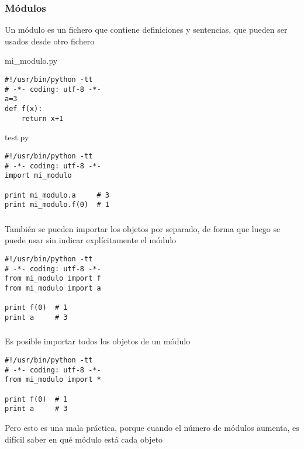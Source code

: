 \documentclass[ucs]{beamer}
\begin{document}
\begin{frame}[fragile]
\frametitle{Módulos}
Un módulo es un fichero que contiene definiciones y sentencias, que pueden ser usados
desde otro fichero

  \begin{footnotesize}
\begin{center}
mi\_modulo.py  
\end{center}
  \begin{verbatim}
#!/usr/bin/python -tt
# -*- coding: utf-8 -*-
a=3
def f(x):
    return x+1
  \end{verbatim}
  \end{footnotesize}

  \begin{footnotesize}
\begin{center}
test.py
\end{center}
  \begin{verbatim}
#!/usr/bin/python -tt
# -*- coding: utf-8 -*-
import mi_modulo

print mi_modulo.a     # 3
print mi_modulo.f(0)  # 1
  \end{verbatim}
  \end{footnotesize}


\end{frame}



\begin{frame}[fragile]
\frametitle{}
También se pueden importar los objetos por separado, de forma
que luego se puede usar sin indicar explícitamente el módulo

  \begin{footnotesize}
  \begin{center}
  \end{center}
  \begin{verbatim}
#!/usr/bin/python -tt
# -*- coding: utf-8 -*-
from mi_modulo import f
from mi_modulo import a

print f(0)  # 1
print a     # 3
  \end{verbatim}
  \end{footnotesize}

\end{frame}


\begin{frame}[fragile]
\frametitle{}
Es posible importar todos los objetos de un módulo

  \begin{footnotesize}
  \begin{verbatim}
#!/usr/bin/python -tt
# -*- coding: utf-8 -*-
from mi_modulo import *

print f(0)  # 1
print a     # 3
  \end{verbatim}
  \end{footnotesize}

Pero esto es una mala práctica, porque cuando el número de módulos
aumenta, es difícil saber en qué módulo está cada objeto
\end{frame}
\end{document}
